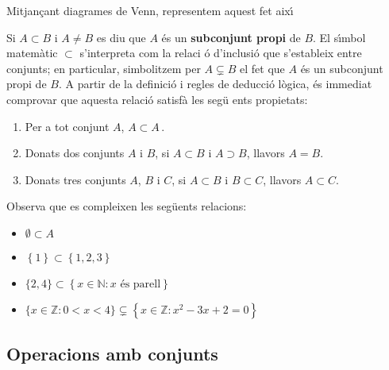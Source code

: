 Mitjan\c{c}ant diagrames de Venn, representem aquest fet aix\'{\i}

Si $A\subset B$ i $A\neq B$ es diu que $A$ \'{e}s un \textbf{subconjunt propi%
} de $B$. El s\'{\i}mbol matem\`{a}tic $\subset$ s'interpreta com la relaci%
\'{o} d'inclusi\'{o} que s'estableix entre conjunts; en particular,
simbolitzem per $A\varsubsetneq B$ el fet que $A$ \'{e}s un subconjunt propi
de $B$. A partir de la definici\'{o} i regles de deducci\'{o} l\`{o}gica,
\'{e}s immediat comprovar que aquesta relaci\'{o} satisf\`{a} les seg\"{u}%
ents propietats:

\begin{enumerate}
\item Per a tot conjunt $A$, $A\subset A\,$.

\item Donats dos conjunts $A$ i $B$, si $A\subset B$ i $A\supset B$, llavors
$A=B$.

\item Donats tres conjunts $A$, $B$ i $C$, si $A\subset B$ i $B\subset C$,
llavors $A\subset C$.
\end{enumerate}

\bigskip

\begin{exemple}
Observa que es compleixen les seg\"{u}ents relacions:

\begin{itemize}
\item $\emptyset\subset A$

\item $\left\{ 1\right\} \subset\left\{ 1,2,3\right\} $

\item $\{2,4\}\subset\left\{ x\in\mathbb{N}:x\text{ \'{e}s parell}\right\} $

\item $\{x\in\mathbb{Z}:0<x<4\}\varsubsetneq\left\{ x\in\mathbb{Z}%
:x^{2}-3x+2=0\right\} $
\end{itemize}
\end{exemple}

\subsection{Operacions amb conjunts}

